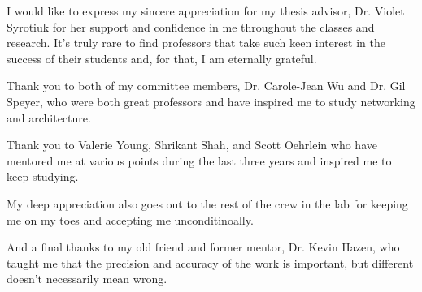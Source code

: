 I would like to express my sincere appreciation for my thesis advisor, Dr. Violet Syrotiuk for her support and confidence in me throughout the classes and research.
It's truly rare to find professors that take such keen interest in the success of their students and, for that, I am eternally grateful.

Thank you to both of my committee members, Dr. Carole-Jean Wu and Dr. Gil Speyer, who were both great professors and have inspired me to study networking and architecture. 

Thank you to Valerie Young, Shrikant Shah, and Scott Oehrlein who have mentored me at various points during the last three years and inspired me to keep studying.

My deep appreciation also goes out to the rest of the crew in the lab for keeping me on my toes and accepting me unconditinoally.

And a final thanks to my old friend and former mentor, Dr. Kevin Hazen, who taught me that the precision and accuracy of the work is important, but different doesn't necessarily mean wrong.

